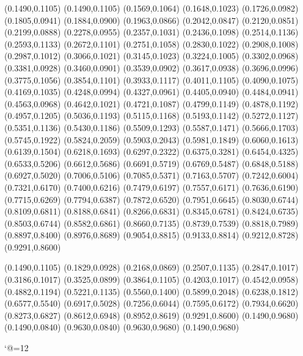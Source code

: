 \PST@Dotted(0.1490,0.1105)
(0.1490,0.1105)
(0.1569,0.1064)
(0.1648,0.1023)
(0.1726,0.0982)
(0.1805,0.0941)
(0.1884,0.0900)
(0.1963,0.0866)
(0.2042,0.0847)
(0.2120,0.0851)
(0.2199,0.0888)
(0.2278,0.0955)
(0.2357,0.1031)
(0.2436,0.1098)
(0.2514,0.1136)
(0.2593,0.1133)
(0.2672,0.1101)
(0.2751,0.1058)
(0.2830,0.1022)
(0.2908,0.1008)
(0.2987,0.1012)
(0.3066,0.1021)
(0.3145,0.1023)
(0.3224,0.1005)
(0.3302,0.0968)
(0.3381,0.0928)
(0.3460,0.0901)
(0.3539,0.0902)
(0.3617,0.0938)
(0.3696,0.0996)
(0.3775,0.1056)
(0.3854,0.1101)
(0.3933,0.1117)
(0.4011,0.1105)
(0.4090,0.1075)
(0.4169,0.1035)
(0.4248,0.0994)
(0.4327,0.0961)
(0.4405,0.0940)
(0.4484,0.0941)
(0.4563,0.0968)
(0.4642,0.1021)
(0.4721,0.1087)
(0.4799,0.1149)
(0.4878,0.1192)
(0.4957,0.1205)
(0.5036,0.1193)
(0.5115,0.1168)
(0.5193,0.1142)
(0.5272,0.1127)
(0.5351,0.1136)
(0.5430,0.1186)
(0.5509,0.1293)
(0.5587,0.1471)
(0.5666,0.1703)
(0.5745,0.1922)
(0.5824,0.2059)
(0.5903,0.2043)
(0.5981,0.1849)
(0.6060,0.1613)
(0.6139,0.1504)
(0.6218,0.1693)
(0.6297,0.2322)
(0.6375,0.3281)
(0.6454,0.4325)
(0.6533,0.5206)
(0.6612,0.5686)
(0.6691,0.5719)
(0.6769,0.5487)
(0.6848,0.5188)
(0.6927,0.5020)
(0.7006,0.5106)
(0.7085,0.5371)
(0.7163,0.5707)
(0.7242,0.6004)
(0.7321,0.6170)
(0.7400,0.6216)
(0.7479,0.6197)
(0.7557,0.6171)
(0.7636,0.6190)
(0.7715,0.6269)
(0.7794,0.6387)
(0.7872,0.6520)
(0.7951,0.6645)
(0.8030,0.6744)
(0.8109,0.6811)
(0.8188,0.6841)
(0.8266,0.6831)
(0.8345,0.6781)
(0.8424,0.6735)
(0.8503,0.6744)
(0.8582,0.6861)
(0.8660,0.7135)
(0.8739,0.7539)
(0.8818,0.7989)
(0.8897,0.8400)
(0.8976,0.8689)
(0.9054,0.8815)
(0.9133,0.8814)
(0.9212,0.8728)
(0.9291,0.8600)

\PST@Plus(0.1490,0.1105)
\PST@Plus(0.1829,0.0928)
\PST@Plus(0.2168,0.0869)
\PST@Plus(0.2507,0.1135)
\PST@Plus(0.2847,0.1017)
\PST@Plus(0.3186,0.1017)
\PST@Plus(0.3525,0.0899)
\PST@Plus(0.3864,0.1105)
\PST@Plus(0.4203,0.1017)
\PST@Plus(0.4542,0.0958)
\PST@Plus(0.4882,0.1194)
\PST@Plus(0.5221,0.1135)
\PST@Plus(0.5560,0.1400)
\PST@Plus(0.5899,0.2048)
\PST@Plus(0.6238,0.1812)
\PST@Plus(0.6577,0.5540)
\PST@Plus(0.6917,0.5028)
\PST@Plus(0.7256,0.6044)
\PST@Plus(0.7595,0.6172)
\PST@Plus(0.7934,0.6620)
\PST@Plus(0.8273,0.6827)
\PST@Plus(0.8612,0.6948)
\PST@Plus(0.8952,0.8619)
\PST@Plus(0.9291,0.8600)
\PST@Border(0.1490,0.9680)
(0.1490,0.0840)
(0.9630,0.0840)
(0.9630,0.9680)
(0.1490,0.9680)

\catcode`@=12
\fi
\endpspicture
